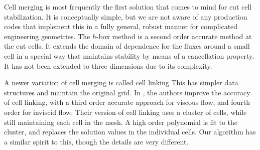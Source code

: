 Cell merging is most frequently the first solution that comes to mind for cut cell stabilization. It is conceptually simple, but 
we are not aware of any production codes that implement this in a fully
general, robust manner for complicated engineering geometries. 
The $h$-box method \cite{mjb-hel-rjl:hbox2,mjb-hel:hboxsimple}
is a second order accurate method at the cut cells. It extends the 
domain of dependence for the fluxes around a small cell in a 
special way that maintains stability by means of a cancellation
property. It  has not been extended to
three dimensions due to its complexity. 

A newer variation of cell merging is called cell linking \cite{cecereGiacomazzi,
KirkpatrickEtAl:2003, HuKhooAdamsHuang:2006,Chung:2006} 
This has simpler data structures and maintain the original grid. 
In \cite{BalajiMenon:2016}, the authors improve the accuracy of cell linking,
with a third order accurate approach for viscous flow,  and fourth order for 
inviscid flow. 
Their version of cell linking uses a cluster of cells, while still maintaining each cell in the mesh.  A high order polynomial is fit to the cluster, and replaces the solution values in the individual cells.  Our algorithm has a similar spirit to this, though the details are very different. 


